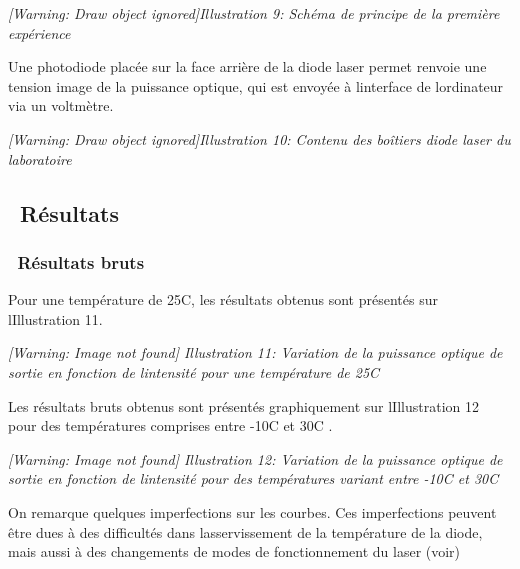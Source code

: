 \documentclass[12pt,twoside]{article}
\begin{document}
\begin{minipage}{15.253cm}
{\itshape
[Warning: Draw object ignored]Illustration 9: Sch\'ema de principe de la
premi\`ere exp\'erience}
\end{minipage}

Une photodiode plac\'ee sur la face arri\`ere de la diode laser permet
renvoie une tension image de la puissance optique, qui est envoy\'ee
\`a l{\textquotesingle}interface de l{\textquotesingle}ordinateur via
un voltm\`etre.

\begin{minipage}{15.253cm}
{\itshape
[Warning: Draw object ignored]Illustration 10: Contenu des bo\^itiers
diode laser du laboratoire}
\end{minipage}

\subsection[\ R\'esultats]{\ R\'esultats}
\subsubsection[\ R\'esultats bruts]{\ R\'esultats bruts}
Pour une temp\'erature de 25{\textdegree}C, les r\'esultats obtenus sont
pr\'esent\'es sur l{\textquotesingle}Illustration 11.

\begin{minipage}{15.334cm}
{\itshape
 [Warning: Image not found] Illustration
11\label{seq:refIllustration10}: Variation de la puissance optique de
sortie en fonction de l{\textquotesingle}intensit\'e pour une
temp\'erature de 25{\textdegree}C}
\end{minipage}

Les r\'esultats bruts obtenus sont pr\'esent\'es graphiquement sur
l{\textquotesingle}Illustration 12 pour des temp\'eratures comprises
entre {}-10{\textdegree}C et 30{\textdegree}C .

\begin{minipage}{15.334cm}
{\itshape
 [Warning: Image not found] Illustration
12\label{seq:refIllustration11}: Variation de la puissance optique de
sortie en fonction de l{\textquotesingle}intensit\'e pour des
temp\'eratures variant entre {}-10{\textdegree}C et 30{\textdegree}C}
\end{minipage}

On remarque quelques imperfections sur les courbes. Ces imperfections
peuvent \^etre dues \`a des difficult\'es dans
l{\textquotesingle}asservissement de la temp\'erature de la diode, mais
aussi \`a des changements de modes de fonctionnement du laser (voir)
\end{document}
